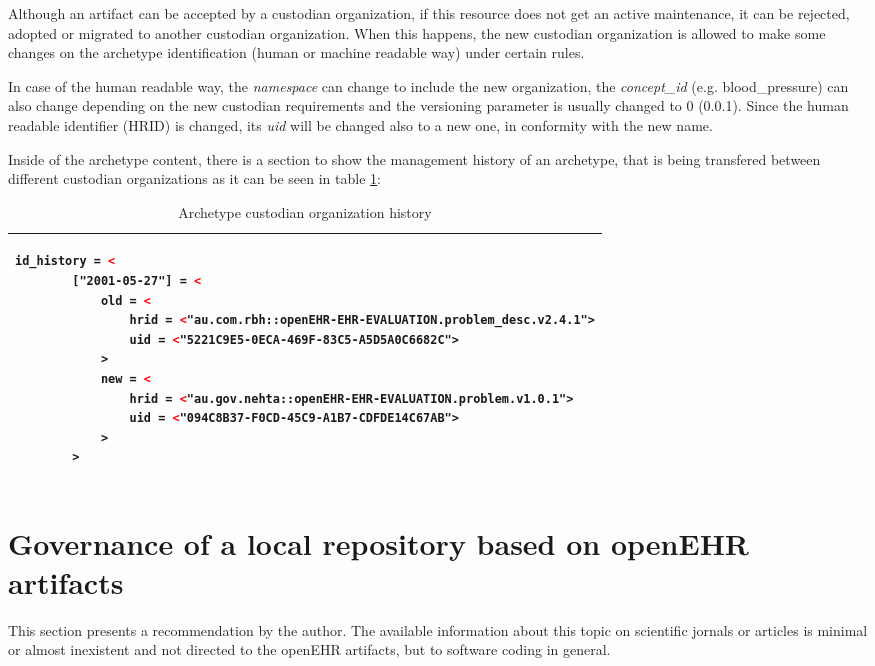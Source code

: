 \documentclass[mim_thesis.tex]{subfiles}
\begin{document}
Although an artifact can be accepted by a custodian organization, if this resource does not get an active maintenance, it can be rejected, adopted or migrated to another custodian organization. When this happens, the new custodian organization is allowed to make some changes on the archetype identification (human or machine readable way) under certain rules. 

In case of the human readable way, the \textit{namespace} can change to include the new organization, the \textit{concept\_id} (e.g. blood\_pressure) can also change depending on the new custodian requirements and the versioning parameter is usually changed to 0 (0.0.1). Since the human readable identifier (HRID) is changed, its \textit{uid} will be changed also to a new one, in conformity with the new name. 

Inside of the archetype content, there is a section to show the management history of an archetype, that is being transfered between different custodian organizations as it can be seen in table \ref{tab:arch_co_h}:

\begin{table}[H]
\caption{Archetype custodian organization history \citep{openehrckmgover2018}}
\label{tab:arch_co_h}
\centering
\begin{tabular}{l}
\toprule[2pt]
\begin{lstlisting}[language=XML]
    id_history = <
        ["2001-05-27"] = <
            old = <
                hrid = <"au.com.rbh::openEHR-EHR-EVALUATION.problem_desc.v2.4.1">
                uid = <"5221C9E5-0ECA-469F-83C5-A5D5A0C6682C">
            >
            new = <
                hrid = <"au.gov.nehta::openEHR-EHR-EVALUATION.problem.v1.0.1">
                uid = <"094C8B37-F0CD-45C9-A1B7-CDFDE14C67AB">
            >
        >
\end{lstlisting}
\tabularnewline \bottomrule[2pt]
\end{tabular}
\end{table}


\newpage
\section{Governance of a local repository based on openEHR artifacts}

This section presents a recommendation by the author. The available information about this topic on scientific jornals or articles is minimal or almost inexistent and not directed to the openEHR artifacts, but to software coding in general. \\
\end{document}
